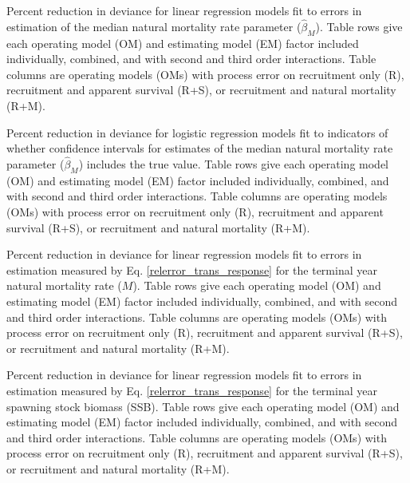 \documentclass[
  12pt,
]{article}
\begin{document}
\begin{table}
\caption{Percent reduction in deviance for linear regression models fit to errors in estimation of the median natural mortality rate parameter ($\widehat \beta_M$). Table rows give each operating model (OM) and estimating model (EM) factor included individually, combined, and with second and third order interactions. Table columns are operating models (OMs) with process error on recruitment only (R), recruitment and apparent survival (R+S), or recruitment and natural mortality (R+M).}\label{bias_median_M_converged_PRD_table}
{}
\end{table}
\pagebreak

\begin{table}
\caption{Percent reduction in deviance for logistic regression models fit to indicators of whether confidence intervals for estimates of the median natural mortality rate parameter ($\widehat \beta_M$) includes the true value. Table rows give each operating model (OM) and estimating model (EM) factor included individually, combined, and with second and third order interactions. Table columns are operating models (OMs) with process error on recruitment only (R), recruitment and apparent survival (R+S), or recruitment and natural mortality (R+M).}\label{mean_M_ci_coverage_PRD_table}
{}
\end{table}
\pagebreak

\begin{table}
\caption{Percent reduction in deviance for linear regression models fit to errors in estimation measured by Eq. \ref{relerror_trans_response} for the terminal year natural mortality rate ($M$). Table rows give each operating model (OM) and estimating model (EM) factor included individually, combined, and with second and third order interactions. Table columns are operating models (OMs) with process error on recruitment only (R), recruitment and apparent survival (R+S), or recruitment and natural mortality (R+M).}\label{bias_M_PRD_table}
{}
\end{table}
\pagebreak

\begin{table}
\caption{Percent reduction in deviance for linear regression models fit to errors in estimation measured by Eq. \ref{relerror_trans_response} for the terminal year spawning stock biomass (SSB). Table rows give each operating model (OM) and estimating model (EM) factor included individually, combined, and with second and third order interactions. Table columns are operating models (OMs) with process error on recruitment only (R), recruitment and apparent survival (R+S), or recruitment and natural mortality (R+M).}\label{bias_SSB_PRD_table}
{}
\end{table}
\pagebreak
\end{document}
